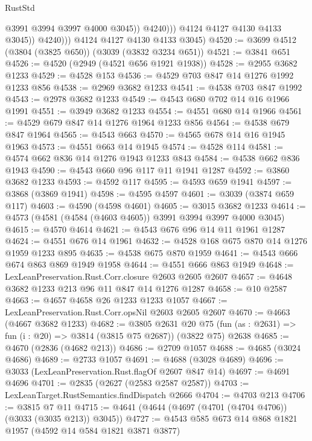 \begin{lexlean}{RustStd}
\begin{coremodule}
                          @3991
                          @3994
                          @3997
                          @4000
                          @3045))
                      @4240)))
                @4124
                @4127
                @4130
                @4133
                @3045))
            @4240)))
      @4124
      @4127
      @4130
      @4133
      @3045)
@4520 := @3699 @4512 (@3804 (@3825 @650)) (@3039 (@3832 @3234 @651))
@4521 := @3841 @651
@4526 := @4520 (@2949 (@4521 @656 @1921 @1938))
@4528 := @2955 @3682 @1233
@4529 := @4528 @153
@4536 := @4529 @703 @847 @14 @1276 @1992 @1233 @856
@4538 := @2969 @3682 @1233
@4541 := @4538 @703 @847 @1992
@4543 := @2978 @3682 @1233
@4549 := @4543 @680 @702 @14 @16 @1966 @1991
@4551 := @3949 @3682 @1233
@4554 := @4551 @680 @14 @1966
@4561 := @4529 @679 @847 @14 @1276 @1964 @1233 @856
@4564 := @4538 @679 @847 @1964
@4565 := @4543 @663
@4570 := @4565 @678 @14 @16 @1945 @1963
@4573 := @4551 @663 @14 @1945
@4574 := @4528 @114
@4581 := @4574 @662 @836 @14 @1276 @1943 @1233 @843
@4584 := @4538 @662 @836 @1943
@4590 := @4543 @660 @96 @117 @11 @1941 @1287
@4592 := @3860 @3682 @1233
@4593 := @4592 @117
@4595 := @4593 @659 @1941
@4597 := @3868 (@3869 @1941)
@4598 := @4595 @4597
@4601 := @3039 (@3874 @659 @117)
@4603 := @4590 (@4598 @4601)
@4605 := @3015 @3682 @1233
@4614 := @4573 (@4581 (@4584 (@4603 @4605)) @3991 @3994 @3997 @4000 @3045)
@4615 := @4570 @4614
@4621 := @4543 @676 @96 @14 @11 @1961 @1287
@4624 := @4551 @676 @14 @1961
@4632 := @4528 @168 @675 @870 @14 @1276 @1959 @1233 @895
@4635 := @4538 @675 @870 @1959
@4641 := @4543 @666 @674 @863 @869 @1949 @1958
@4644 := @4551 @666 @863 @1949
@4648 := LexLeanPreservation.Rust.Corr.closure @2603 @2605 @2607
@4657 := @4648 @3682 @1233 @213 @96 @11 @847 @14 @1276 @1287
@4658 := @10 @2587
@4663 := @4657 @4658 @26 @1233 @1233 @1057
@4667 := LexLeanPreservation.Rust.Corr.opsNil @2603 @2605 @2607
@4670 := @4663 (@4667 @3682 @1233)
@4682 := @3805
    @2631
    @20
    @75
    (fun (as : @2631) => fun (i : @20) => @3814 (@3815 @75 @2687))
    (@3822 @75)
    @2638
@4685 := @4670 (@2836 (@4682 @213))
@4686 := @2709 @1057
@4688 := @4685 (@3024 @4686)
@4689 := @2733 @1057
@4691 := @4688 (@3028 @4689)
@4696 := @3033 (LexLeanPreservation.Rust.flagOf @2607 @847 @14)
@4697 := @4691 @4696
@4701 := @2835 (@2627 (@2583 @2587 @2587))
@4703 := LexLeanTarget.RustSemantics.findDispatch @2666
@4704 := @4703 @213
@4706 := @3815 @7 @11
@4715 := @4641 (@4644 (@4697 (@4701 (@4704 @4706)) (@3033 (@3035 @213)) @3045))
@4727 := @4543 @585 @673 @14 @868 @1821 @1957 (@4592 @14 @584 @1821 @3871 @3877)

\end{coremodule}
\end{lexlean}
